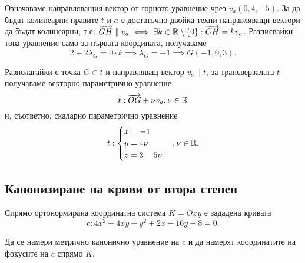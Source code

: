 \documentclass[numbers=endperiod, DIV=15]{scrartcl}
\begin{document}
\begin{solution}
\begin{enumerate}[label=\alph*)]
    Означаваме направляващия вектор от горното уравнение чрез $v_a(0, 4, -5)$. За да бъдат колинеарни правите $t$ и $a$ е достатъчно двойка техни направляващи вектори да бъдат колинеарни, т.е. $\overrightarrow{GH} \parallel v_a \iff \exists k \in \mathbb{R} \setminus \{ 0 \} : \overrightarrow{GH} = k v_a$. Разписвайки това уравнение само за първата координата, получаваме
    \begin{displaymath}
      2 + 2\lambda_G = 0 \cdot k \implies \lambda_G = -1 \implies G(-1, 0, 3).
    \end{displaymath}

    Разполагайки с точка $G \in t$ и направляващ вектор $v_a \parallel t$, за трансверзалата $t$ получаваме векторно параметрично уравнение
    \begin{displaymath}
      t: \overrightarrow{OG} + \nu v_a, \nu \in \mathbb{R}
    \end{displaymath}
    и, съответно, скаларно параметрично уравнение
    \begin{displaymath}
      t: \begin{cases}
        x = -1 \\
        y = 4\nu \\
        z = 3 - 5\nu
      \end{cases},
      \nu \in \mathbb{R}.
    \end{displaymath}
  \end{enumerate}
\end{solution}

\subsection{Канонизиране на криви от втора степен}

\begin{exercise}
  Спрямо ортонормирана координатна система $K = Oxy$ е зададена кривата
  \begin{displaymath}
    c: 4x^2 - 4xy + y^2 + 2x - 16y - 8 = 0.
  \end{displaymath}

  Да се намери метрично канонично уравнение на $c$ и да намерят координатите на фокусите на $c$ спрямо $K$.
\end{exercise}
\end{document}
